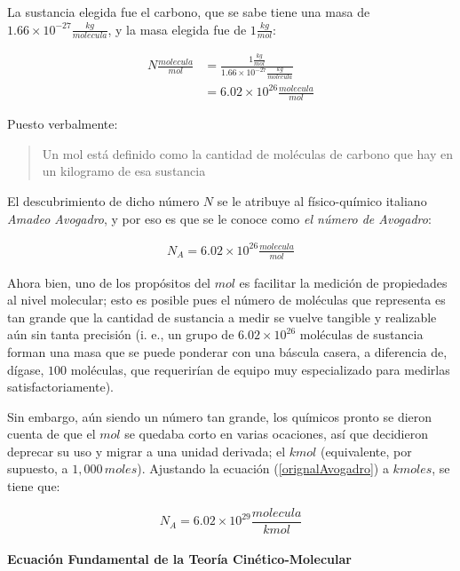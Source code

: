 \documentclass{article}
\begin{document}
La sustancia elegida fue el carbono, que se sabe tiene una masa de \(1.66\times10^{-27}\frac{kg}{molecula}\),
y la masa elegida fue de \(1\frac{kg}{mol}\):

\begin{align*}
    N\frac{molecula}{mol} &= \frac{1\frac{kg}{mol}}{1.66 \times 10^{-27}\frac{kg}{molecula}}\\
    &= 6.02 \times 10^{26} \frac{molecula}{mol}
\end{align*}

Puesto verbalmente:

\begin{quote}
    Un mol está definido como la cantidad de moléculas
    de carbono que hay en un kilogramo de esa sustancia
\end{quote}

El descubrimiento de dicho número \(N\) se le atribuye al físico-químico
italiano \textit{Amadeo Avogadro}, y por eso es que se le conoce
como \textit{el número de Avogadro}:

\begin{align}
    N_A = 6.02 \times 10^{26} \frac{molecula}{mol} \label{orignalAvogadro}
\end{align}

Ahora bien, uno de los propósitos del \(mol\) es facilitar
la medición de propiedades al nivel molecular; esto es
posible pues el número de moléculas que representa es tan grande
que la cantidad de sustancia a medir se vuelve tangible y
realizable aún sin tanta precisión (i. e., un grupo de 
\(6.02 \times 10^{26}\) moléculas de sustancia forman una masa
que se puede ponderar con una báscula casera, a diferencia de, dígase,
\(100\) moléculas, que requerirían de equipo muy especializado 
para medirlas satisfactoriamente).

Sin embargo, aún siendo un número tan grande, los químicos 
pronto se dieron cuenta de que el \(mol\) se quedaba 
corto en varias ocaciones, así que decidieron deprecar su uso y migrar
a una unidad derivada; el \(kmol\) (equivalente, por supuesto,
a \(1,000\,moles\)). Ajustando la ecuación (\ref{orignalAvogadro}) a \(kmoles\),
se tiene que:

\[
    N_A = 6.02 \times 10^{29} \frac{molecula}{kmol}
\]


\paragraph*{Ecuación Fundamental de la Teoría Cinético-Molecular}
\end{document}

